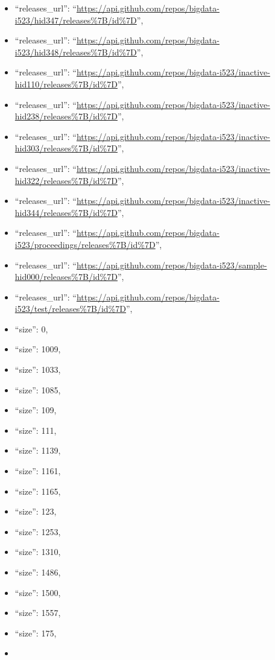 \begin{itemize}
\item
  ``releases\_url'':
  ``\url{https://api.github.com/repos/bigdata-i523/hid347/releases\%7B/id\%7D}'',
\item
  ``releases\_url'':
  ``\url{https://api.github.com/repos/bigdata-i523/hid348/releases\%7B/id\%7D}'',
\item
  ``releases\_url'':
  ``\url{https://api.github.com/repos/bigdata-i523/inactive-hid110/releases\%7B/id\%7D}'',
\item
  ``releases\_url'':
  ``\url{https://api.github.com/repos/bigdata-i523/inactive-hid238/releases\%7B/id\%7D}'',
\item
  ``releases\_url'':
  ``\url{https://api.github.com/repos/bigdata-i523/inactive-hid303/releases\%7B/id\%7D}'',
\item
  ``releases\_url'':
  ``\url{https://api.github.com/repos/bigdata-i523/inactive-hid322/releases\%7B/id\%7D}'',
\item
  ``releases\_url'':
  ``\url{https://api.github.com/repos/bigdata-i523/inactive-hid344/releases\%7B/id\%7D}'',
\item
  ``releases\_url'':
  ``\url{https://api.github.com/repos/bigdata-i523/proceedings/releases\%7B/id\%7D}'',
\item
  ``releases\_url'':
  ``\url{https://api.github.com/repos/bigdata-i523/sample-hid000/releases\%7B/id\%7D}'',
\item
  ``releases\_url'':
  ``\url{https://api.github.com/repos/bigdata-i523/test/releases\%7B/id\%7D}'',
\item
  ``size'': 0,
\item
  ``size'': 1009,
\item
  ``size'': 1033,
\item
  ``size'': 1085,
\item
  ``size'': 109,
\item
  ``size'': 111,
\item
  ``size'': 1139,
\item
  ``size'': 1161,
\item
  ``size'': 1165,
\item
  ``size'': 123,
\item
  ``size'': 1253,
\item
  ``size'': 1310,
\item
  ``size'': 1486,
\item
  ``size'': 1500,
\item
  ``size'': 1557,
\item
  ``size'': 175,
\item

\end{itemize}
